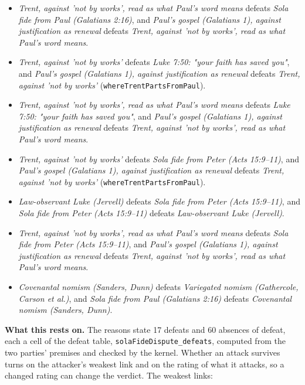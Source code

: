 \documentclass[11pt]{article}
\begin{document}
\begin{itemize}
\begin{itemize}
\item \emph{Trent, against 'not by works', read as what Paul's word means} defeats \emph{Sola fide from Paul (Galatians 2:16)}, and \emph{Paul's gospel (Galatians 1), against justification as renewal} defeats \emph{Trent, against 'not by works', read as what Paul's word means}.
\item \emph{Trent, against 'not by works'} defeats \emph{Luke 7:50: "your faith has saved you"}, and \emph{Paul's gospel (Galatians 1), against justification as renewal} defeats \emph{Trent, against 'not by works'} (\texttt{where\allowbreak{}Trent\allowbreak{}Parts\allowbreak{}From\allowbreak{}Paul}).
\item \emph{Trent, against 'not by works', read as what Paul's word means} defeats \emph{Luke 7:50: "your faith has saved you"}, and \emph{Paul's gospel (Galatians 1), against justification as renewal} defeats \emph{Trent, against 'not by works', read as what Paul's word means}.
\item \emph{Trent, against 'not by works'} defeats \emph{Sola fide from Peter (Acts 15:9–11)}, and \emph{Paul's gospel (Galatians 1), against justification as renewal} defeats \emph{Trent, against 'not by works'} (\texttt{where\allowbreak{}Trent\allowbreak{}Parts\allowbreak{}From\allowbreak{}Paul}).
\item \emph{Law-observant Luke (Jervell)} defeats \emph{Sola fide from Peter (Acts 15:9–11)}, and \emph{Sola fide from Peter (Acts 15:9–11)} defeats \emph{Law-observant Luke (Jervell)}.
\item \emph{Trent, against 'not by works', read as what Paul's word means} defeats \emph{Sola fide from Peter (Acts 15:9–11)}, and \emph{Paul's gospel (Galatians 1), against justification as renewal} defeats \emph{Trent, against 'not by works', read as what Paul's word means}.
\item \emph{Covenantal nomism (Sanders, Dunn)} defeats \emph{Variegated nomism (Gathercole, Carson et al.)}, and \emph{Sola fide from Paul (Galatians 2:16)} defeats \emph{Covenantal nomism (Sanders, Dunn)}.
\end{itemize}
\end{itemize}
\par\noindent\textbf{What this rests on.} The reasons state 17 defeats and 60 absences of defeat, each a cell of the defeat table, \texttt{sola\allowbreak{}Fide\allowbreak{}Dispute\_\allowbreak{}defeats}, computed from the two parties' premises and checked by the kernel. Whether an attack survives turns on the attacker's weakest link and on the rating of what it attacks, so a changed rating can change the verdict. The weakest links:
\end{document}
